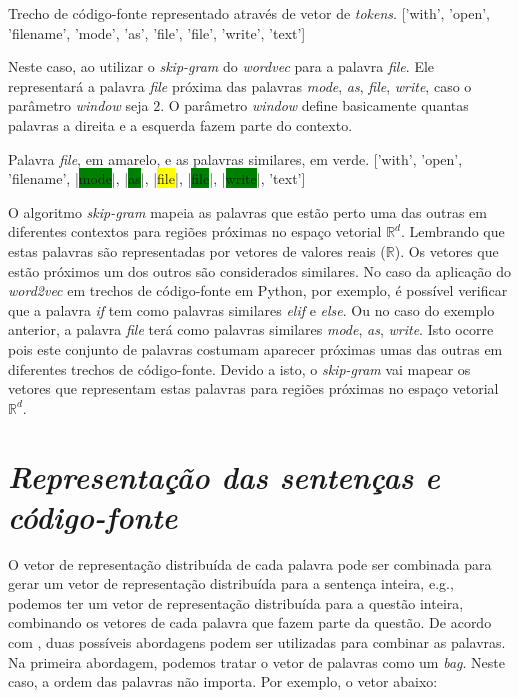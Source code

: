 \begin{mypythonembedding}{Trecho de código-fonte representado através de vetor de \textit{tokens}.}
  ['with', 'open', 'filename', 'mode', 'as', 'file', 'file', 'write', 'text']
\end{mypythonembedding}

Neste caso, ao utilizar o \textit{skip-gram} do \textit{wordvec} para a palavra \emph{file}. Ele representará a palavra \emph{file} próxima das palavras \emph{mode}, \emph{as}, \emph{file}, \emph{write}, caso o parâmetro \textit{window} seja $2$. O parâmetro \textit{window} define basicamente quantas palavras a direita e a esquerda fazem parte do contexto.

\begin{mypythonembedding}{Palavra \textit{file}, em amarelo, e as palavras similares, em verde.}
  ['with', 'open', 'filename', |\colorbox{green}{mode}|, |\colorbox{green}{as}|, |\colorbox{yellow}{file}|, |\colorbox{green}{file}|, |\colorbox{green}{write}|, 'text']
\end{mypythonembedding}

O algoritmo \textit{skip-gram} mapeia as palavras que estão perto uma das outras em diferentes contextos para regiões próximas no espaço vetorial $\mathbb{R}^{d}$. Lembrando que estas palavras são representadas por vetores de valores reais ($\mathbb{R}$). Os vetores que estão próximos um dos outros são considerados similares. No caso da aplicação do \textit{word2vec} em trechos de código-fonte em Python, por exemplo, é possível verificar que a palavra \emph{if} tem como palavras similares \emph{elif} e \emph{else}. Ou no caso do exemplo anterior, a palavra \emph{file} terá como palavras similares \emph{mode}, \emph{as}, \emph{write}. Isto ocorre pois este conjunto de palavras costumam aparecer próximas umas das outras em diferentes trechos de código-fonte. Devido a isto, o \textit{skip-gram} vai mapear os vetores que representam estas palavras para regiões próximas no espaço vetorial $\mathbb{R}^{d}$.


\section{\textit{Representação das sentenças e código-fonte}}
\label{sec:representacao-das-sentencas-fundamentacao-teorica}

O vetor de representação distribuída de cada palavra pode ser combinada para gerar um vetor de representação distribuída para a sentença inteira, e.g., podemos ter um vetor de representação distribuída para a questão inteira, combinando os vetores de cada palavra que fazem parte da questão. De acordo com \cite{cambronero-deep-learning-code-search:2019}, duas possíveis abordagens podem ser utilizadas para combinar as palavras. Na primeira abordagem, podemos tratar o vetor de palavras como um \textit{bag}. Neste caso, a ordem das palavras não importa. Por exemplo, o vetor abaixo:

